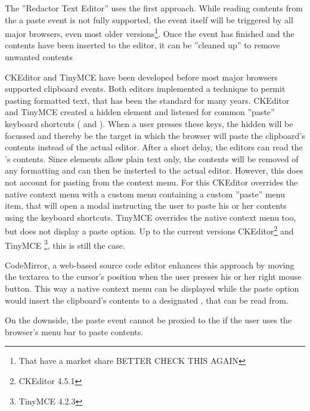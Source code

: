 The ''Redactor Text Editor'' uses the first approach. While reading contents from the a paste event is not fully supported, the event itself will be triggered by all major browsers, even most older versions\footnote{That have a market share BETTER CHECK THIS AGAIN}. Once the event has finished and the contents have been inserted to the editor, it can be ''cleaned up'' to remove unwanted contents

CKEditor and TinyMCE have been developed before most major browsers supported clipboard events. Both editors implemented a technique to permit pasting formatted text, that has been the standard for many years. CKEditor and TinyMCE created a hidden  element and listened for common ''paste'' keyboard shortcuts ( and ). When a user presses these keys, the hidden  will be focussed and thereby be the target in which the browser will paste the clipboard's contents instead of the actual editor. After a short delay, the editors can read the 's contents. Since  elements allow plain text only, the contents will be removed of any formatting and can then be insterted to the actual editor. However, this does not account for pasting from the context menu. For this CKEditor overrides the native context menu with a custom menu containing a custom ''paste'' menu item, that will open a modal instructing the user to paste his or her contents using the keyboard shortcuts. TinyMCE overrides the native context menu too, but does not display a paste option. Up to the current versions CKEditor\footnote{CKEditor 4.5.1 } and TinyMCE \footnote{TinyMCE 4.2.3}, this is still the case.

CodeMirror, a web-based source code editor enhances this approach by moving the textarea to the cursor's position when the user presses his or her right mouse button. This way a native context menu can be displayed while the paste option would insert the clipboard's contents to a designated , that can be read from.

On the downside, the paste event cannot be proxied to the  if the user uses the browser's menu bar to paste contents.


